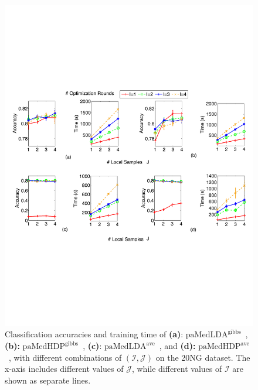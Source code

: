\documentclass[twoside,11pt]{article}
\newcommand\paMedLDAave{$\text{paMedLDA}^{\text{ave}}$~}
\newcommand\paMedLDAgibbs{$\text{paMedLDA}^{\text{gibbs}}$~}
\newcommand\paMedHDPave{$\text{paMedHDP}^{\text{ave}}$~}
\newcommand\paMedHDPgibbs{$\text{paMedHDP}^{\text{gibbs}}$~}
\begin{document}
\begin{figure}[t]
\includegraphics[width = \textwidth]{plot_ij.pdf}
\caption{Classification accuracies and training time of \textbf{(a)}: \paMedLDAgibbs, \textbf{(b):} \paMedHDPgibbs, \textbf{(c)}: \paMedLDAave, and \textbf{(d):} \paMedHDPave, with different combinations of $(\mathcal{I}, \mathcal{J})$ on the 20NG dataset. The x-axis includes different values of $\mathcal{J}$, while different values of $\mathcal{I}$ are shown as separate lines. }
\label{fg:multic_IJ}
\end{figure}
\end{document}
